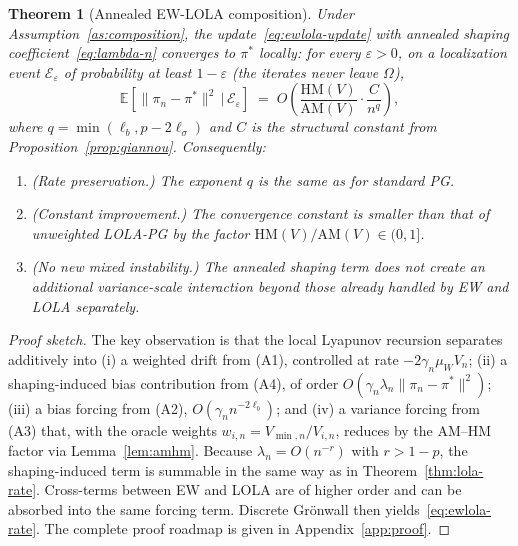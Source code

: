 \documentclass{article}
\theoremstyle{plain}
\newtheorem{theorem}{Theorem}[section]
\theoremstyle{definition}
\theoremstyle{remark}
\newcommand{\HM}{\mathrm{HM}}
\newcommand{\AM}{\mathrm{AM}}
\newcommand{\E}{\mathbb{E}}
\begin{document}
\begin{theorem}[Annealed EW-LOLA composition]\label{thm:ewlola}
Under Assumption~\ref{as:composition}, the update~\eqref{eq:ewlola-update} with annealed shaping coefficient~\eqref{eq:lambda-n} converges to $\pi^\ast$ locally: for every $\varepsilon>0$, on a localization event $\mathcal{E}_\varepsilon$ of probability at least $1-\varepsilon$ (the iterates never leave $\Omega$),
\begin{equation}\label{eq:ewlola-rate}
\E\!\left[\|\pi_n-\pi^\ast\|^2 \,\big|\, \mathcal{E}_\varepsilon\right] \;=\; O\!\left(\frac{\HM(V)}{\AM(V)}\cdot\frac{C}{n^q}\right),
\end{equation}
where $q=\min(\ell_b,p-2\ell_\sigma)$ and $C$ is the structural constant from Proposition~\ref{prop:giannou}. Consequently:
\begin{enumerate}[leftmargin=1.8em,itemsep=0.15em,label=\textup{(\alph*)}]
  \item \textup{(Rate preservation.)} The exponent $q$ is the same as for standard PG.
  \item \textup{(Constant improvement.)} The convergence constant is smaller than that of unweighted LOLA-PG by the factor $\HM(V)/\AM(V)\in(0,1]$.
  \item \textup{(No new mixed instability.)} The annealed shaping term does not create an additional variance-scale interaction beyond those already handled by EW and LOLA separately.
\end{enumerate}
\end{theorem}

\begin{proof}[Proof sketch]
The key observation is that the local Lyapunov recursion separates additively into (i) a weighted drift from (A1), controlled at rate $-2\gamma_n\mu_W V_n$; (ii) a shaping-induced bias contribution from (A4), of order $O(\gamma_n\lambda_n\|\pi_n-\pi^\ast\|^2)$; (iii) a bias forcing from (A2), $O(\gamma_n n^{-2\ell_b})$; and (iv) a variance forcing from (A3) that, with the oracle weights $w_{i,n}=V_{\min,n}/V_{i,n}$, reduces by the AM--HM factor via Lemma~\ref{lem:amhm}. Because $\lambda_n=O(n^{-r})$ with $r>1-p$, the shaping-induced term is summable in the same way as in Theorem~\ref{thm:lola-rate}. Cross-terms between EW and LOLA are of higher order and can be absorbed into the same forcing term. Discrete Gr\"onwall then yields~\eqref{eq:ewlola-rate}. The complete proof roadmap is given in Appendix~\ref{app:proof}.
\end{proof}
\end{document}
